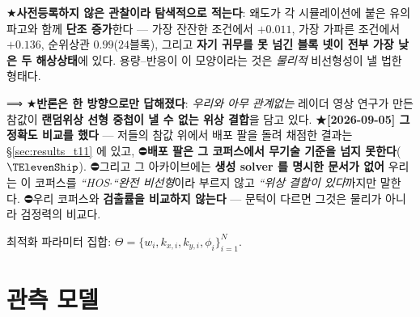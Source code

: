 \documentclass[11pt]{report}
\numberwithin{equation}{chapter}
\numberwithin{figure}{chapter}
\numberwithin{table}{chapter}
\begin{document}
★\textbf{사전등록하지 않은 관찰이라 탐색적으로 적는다}: 왜도가 각 시뮬레이션에 붙은
유의파고와 함께 \textbf{단조 증가}한다 --- 가장 잔잔한 조건에서 $+0.011$, 가장 가파른
조건에서 $+0.136$, 순위상관 $0.99$($24$블록), 그리고 \textbf{자기 귀무를 못 넘긴 블록
넷이 전부 가장 낮은 두 해상상태}에 있다. 용량--반응이 이 모양이라는 것은
\emph{물리적} 비선형성이 낼 법한 형태다.

⟹ ★\textbf{반론은 한 방향으로만 답해졌다}: \emph{우리와 아무 관계없는} 레이더 영상
연구가 만든 참값이 \textbf{랜덤위상 선형 중첩이 낼 수 없는 위상 결합}을 담고 있다.
★\textbf{[2026-09-05] 그 정확도 비교를 했다} --- 저들의 참값 위에서 배포 팔을 돌려
채점한 결과는 \S\ref{sec:results_t11} 에 있고, ⛔\textbf{배포 팔은 그 코퍼스에서 무기술
기준을 넘지 못한다}($\TElevenShip$). ⛔그리고 그 아카이브에는 \textbf{생성 solver 를 명시한 문서가
없어} 우리는 이 코퍼스를 \emph{``HOS}$\cdot$\emph{``완전 비선형}이라 부르지 않고
\emph{``위상 결합이 있다}까지만 말한다. ⛔우리 코퍼스와 \textbf{검출률을 비교하지
않는다} --- 문턱이 다르면 그것은 물리가 아니라 검정력의 비교다.

최적화 파라미터 집합: $\Theta = \{w_i, k_{x,i}, k_{y,i}, \phi_i\}_{i=1}^{N}$.

\section{관측 모델}
\label{sec:observation}
\end{document}
